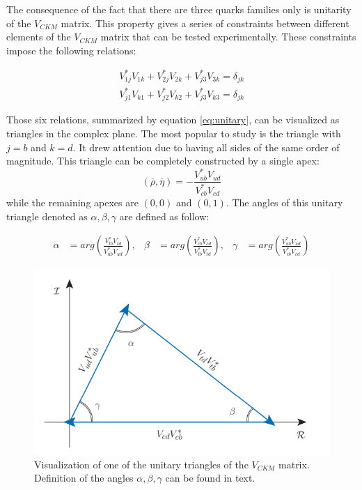  The consequence of the fact that there are three quarks families only is unitarity of the $V_{CKM}$ matrix. This property gives a series of constraints between different elements of the  $V_{CKM}$ matrix that can be tested experimentally. These constraints impose the following relations:

\begin{equation}
\label{eq:unitary}
\begin{split}
        V_{1j}^{*}V_{1k} +  V_{2j}^{*}V_{2k} +  V_{j3}^{*}V_{3k} = \delta_{jk} \\
        V_{j1}^{*}V_{k1} +  V_{j2}^{*}V_{k2} +  V_{j3}^{*}V_{k3} = \delta_{jk} 
\end{split}
\end{equation}

Those six relations, summarized by equation \ref{eq:unitary}, can be visualized as triangles in the complex plane.  The most popular to study is the triangle with  $j=b$ and $k=d$. It drew attention due to having all sides of the same order of magnitude.  This triangle can be completely constructed by a single apex:
\begin{equation}
   (\overline{\rho}, \overline{\eta}) =- \frac{V_{ub}^{*}V_{ud}}{V_{cb}^{*}V_{cd}}
\end{equation}
while the remaining apexes are $(0,0)$ and $(0,1)$.  
The angles of this unitary triangle denoted as $\alpha, \beta, \gamma$ are defined as follow: 

\begin{align*}
   \alpha &= arg\left( \frac{V_{tb}^{*}V_{td}}{V_{ub}^{*}V_{ud}} \right), & 
   \beta &=  arg\left( \frac{V_{cb}^{*}V_{cd}}{V_{tb}^{*}V_{td}} \right), &
   \gamma &= arg\left( \frac{V_{ub}^{*}V_{ud}}{V_{cb}^{*}V_{cd}} \right) 
\end{align*}



\begin{figure}[h]
\centering
\includegraphics[scale=0.8]{figures/Unitary_triangle.PNG}
\caption{Visualization of one of the unitary triangles of the $V_{CKM}$ matrix. Definition of the angles $\alpha, \beta, \gamma$ can be found in text.   
\label{fig:triangle}}
\end{figure}

